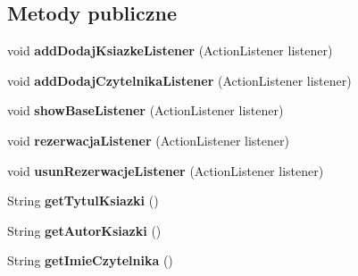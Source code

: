 \subsection*{Metody publiczne}
\begin{DoxyCompactItemize}
\item 
\hypertarget{classbiblioteka_1_1_main_panel_a44f32e074f14c0fff8a5400db110ba33}{}void {\bfseries add\+Dodaj\+Ksiazke\+Listener} (Action\+Listener listener)\label{classbiblioteka_1_1_main_panel_a44f32e074f14c0fff8a5400db110ba33}

\item 
\hypertarget{classbiblioteka_1_1_main_panel_a74f4bacecbde8fcf47b9d4a80aa268e2}{}void {\bfseries add\+Dodaj\+Czytelnika\+Listener} (Action\+Listener listener)\label{classbiblioteka_1_1_main_panel_a74f4bacecbde8fcf47b9d4a80aa268e2}

\item 
\hypertarget{classbiblioteka_1_1_main_panel_a0fd3cae160a97892c23c0acbfaf33e07}{}void {\bfseries show\+Base\+Listener} (Action\+Listener listener)\label{classbiblioteka_1_1_main_panel_a0fd3cae160a97892c23c0acbfaf33e07}

\item 
\hypertarget{classbiblioteka_1_1_main_panel_a22918328747985b73c275f7989b8d0dd}{}void {\bfseries rezerwacja\+Listener} (Action\+Listener listener)\label{classbiblioteka_1_1_main_panel_a22918328747985b73c275f7989b8d0dd}

\item 
\hypertarget{classbiblioteka_1_1_main_panel_a0a1019eab5d8867eca875d8a45b4f150}{}void {\bfseries usun\+Rezerwacje\+Listener} (Action\+Listener listener)\label{classbiblioteka_1_1_main_panel_a0a1019eab5d8867eca875d8a45b4f150}

\item 
\hypertarget{classbiblioteka_1_1_main_panel_aa63ec952c009506c84c237a99eb685b2}{}String {\bfseries get\+Tytul\+Ksiazki} ()\label{classbiblioteka_1_1_main_panel_aa63ec952c009506c84c237a99eb685b2}

\item 
\hypertarget{classbiblioteka_1_1_main_panel_a427ee72cd6fa7c5f52c955f8a7fae151}{}String {\bfseries get\+Autor\+Ksiazki} ()\label{classbiblioteka_1_1_main_panel_a427ee72cd6fa7c5f52c955f8a7fae151}

\item 
\hypertarget{classbiblioteka_1_1_main_panel_a5e9c92d9da979560029f94cc140ab358}{}String {\bfseries get\+Imie\+Czytelnika} ()\label{classbiblioteka_1_1_main_panel_a5e9c92d9da979560029f94cc140ab358}


\end{DoxyCompactItemize}
